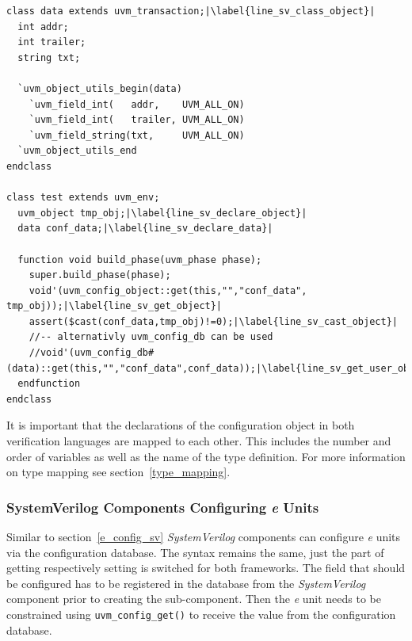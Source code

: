 \lstset{language=SystemVerilog, numbers = left, escapechar=|, breaklines=true}
\begin{lstlisting}[frame=htrbl, caption={SystemVerilog: getting a configuration object}, label={lst:SV_get_object}]
class data extends uvm_transaction;|\label{line_sv_class_object}|
  int addr;
  int trailer;
  string txt;
  
  `uvm_object_utils_begin(data)
    `uvm_field_int(   addr,    UVM_ALL_ON)
    `uvm_field_int(   trailer, UVM_ALL_ON)
    `uvm_field_string(txt,     UVM_ALL_ON)
  `uvm_object_utils_end
endclass

class test extends uvm_env;
  uvm_object tmp_obj;|\label{line_sv_declare_object}|
  data conf_data;|\label{line_sv_declare_data}|
  
  function void build_phase(uvm_phase phase);
    super.build_phase(phase);
    void'(uvm_config_object::get(this,"","conf_data", tmp_obj));|\label{line_sv_get_object}|
    assert($cast(conf_data,tmp_obj)!=0);|\label{line_sv_cast_object}|
    //-- alternativly uvm_config_db can be used
    //void'(uvm_config_db#(data)::get(this,"","conf_data",conf_data));|\label{line_sv_get_user_object}|
  endfunction
endclass
\end{lstlisting}
It is important that the declarations of the configuration object in both verification languages are mapped to each
other. This includes the number and order of variables as well as the name of the type definition. For more information
on type mapping see section~\ref{type_mapping}.

\subsubsection{SystemVerilog Components Configuring \textit{e} Units}
Similar to section~\ref{e_config_sv} \emph{SystemVerilog} components can configure \textit{e} units via the
configuration database. The syntax remains the same, just the part of getting respectively setting is switched for both
frameworks. The field that should be configured has to be registered in the database from the \emph{SystemVerilog}
component prior to creating the sub-component. Then the \textit{e} unit needs to be constrained using
\lstinline$uvm_config_get()$ to receive the value from the configuration database.

